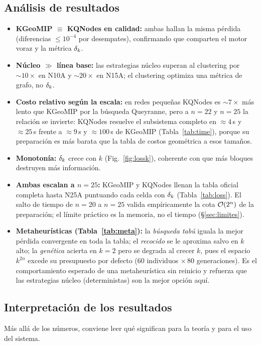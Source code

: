 \documentclass[11pt,letterpaper]{article}
\begin{document}
\subsection{Análisis de resultados}
\begin{itemize}
	\item \textbf{KGeoMIP $\equiv$ KQNodes en calidad:} ambas hallan la misma
	      pérdida (diferencias $\le 10^{-4}$ por desempates), confirmando que comparten
	      el motor voraz y la métrica $\delta_k$.
	\item \textbf{Núcleo $\gg$ línea base:} las estrategias núcleo superan al
	      clustering por $\sim\!10\times$ en N10A y $\sim\!20\times$ en N15A; el clustering
	      optimiza una métrica de grafo, no $\delta_k$.
	\item \textbf{Costo relativo según la escala:} en redes pequeñas KQNodes es
	      $\sim\!7\times$ más lento que KGeoMIP por la búsqueda Queyranne, pero a $n=22$ y
	      $n=25$ la relación se invierte: KQNodes resuelve el subsistema completo en
	      $\approx 4$\,s y $\approx 25$\,s frente a $\approx 9$\,s y $\approx 100$\,s de
	      KGeoMIP (Tabla~\ref{tab:time}), porque su preparación es más barata que la tabla
	      de costos geométrica a esos tamaños.
	\item \textbf{Monotonía:} $\delta_k$ crece con $k$ (Fig.~\ref{fig:lossk}), coherente
	      con que más bloques destruyen más información.
	\item \textbf{Ambas escalan a $n=25$:} KGeoMIP y KQNodes llenan la tabla oficial
	      completa hasta N25A puntuando cada celda con $\delta_k$ (Tabla~\ref{tab:loss}). El
	      salto de tiempo de $n=20$ a $n=25$ valida empíricamente la cota $\mathcal{O}(2^n)$ de
	      la preparación; el límite práctico es la memoria, no el tiempo
	      (§\ref{sec:limites}).
	\item \textbf{Metaheurísticas (Tabla~\ref{tab:meta}):} la \emph{búsqueda tabú}
	      iguala la mejor pérdida convergente en toda la tabla; el \emph{recocido} se le aproxima salvo en
	      $k$ alto; la \emph{genética} acierta en $k=2$ pero se degrada al crecer $k$,
	      pues el espacio $k^{2n}$ excede su presupuesto por defecto ($60$ individuos
	      $\times\,80$ generaciones). Es el comportamiento esperado de una metaheurística sin reinicio y
	      refuerza que las estrategias núcleo (deterministas) son la mejor opción aquí.
\end{itemize}

\subsection{Interpretación de los resultados}
\label{sec:interpretacion}
Más allá de los números, conviene leer qué significan para la teoría y para el uso
del sistema.
\end{document}
